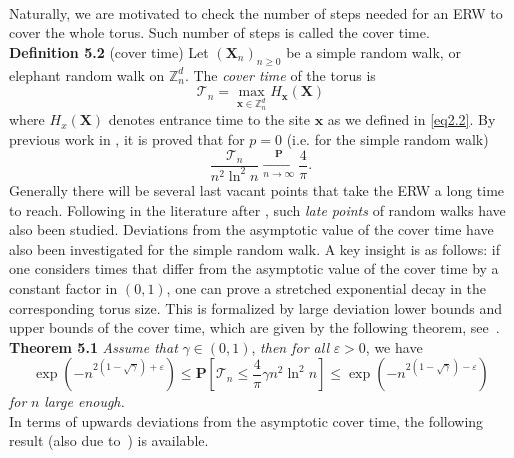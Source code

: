 \documentclass[
11pt, %
a4paper, %
oneside, %
headinclude,footinclude, %
BCOR5mm, %
]{scrartcl}
\begin{document}
\vspace{0.6em}\\ Naturally, we are motivated to check the number of steps needed for an ERW to cover the whole torus. Such number of steps is called the cover time.
\vspace{0.6em}\\\textbf{Definition 5.2} (cover time) Let $(\mathbf{X}_n)_{n \geq 0}$ be a simple random walk, or elephant random walk on  $\mathbb{Z}_n^d$. The \textit{cover time} of the torus is 
\begin{equation}
    \mathcal{T}_n=\max_{\mathbf{x} \in \mathbb{Z}_n^d}H_\mathbf{x}(\mathbf{X}) \tag{5.4}
\end{equation}
where $H_x(\mathbf{X})$ denotes entrance time to the site ${\mathbf{x}}$ as we defined in \eqref{eq2.2}. By previous work in \cite{dembo2004cover}, it is proved that for $p = 0$ (i.e. for the simple random walk)
\begin{equation}
    \label{eq5.5}
    \frac{\mathcal{T}_n}{n^2\ln^2n}\xrightarrow[n \rightarrow \infty]{\mathbf{P}}\frac{4}{\pi}. \tag{5.5} 
\end{equation}
Generally there will be several last vacant points that take the ERW a long time to reach. Following in the literature after \cite{dembo2004cover}, such
\textit{late points} of random walks have also been studied. Deviations from the asymptotic value of the cover time have also been investigated for the simple random walk. A key insight is as follows: if one considers times that differ from the asymptotic value of the cover time by a constant factor in $(0,1)$, one can prove a stretched exponential decay in the corresponding torus size. This is formalized by large deviation lower bounds and upper bounds of the cover time, which are given by the following theorem, see~\cite{comets2013large}.
\vspace{0.6em}\\\textbf{Theorem 5.1} \textit{Assume that} $\gamma \in (0,1)$, \textit{then for all} $\varepsilon>0$, we have
\begin{equation}
    \exp{\left(-n^{2(1-\sqrt{\gamma})+\varepsilon}\right)} \leq \mathbf{P}\left[\mathcal{T}_n \leq \frac{4}{\pi}\gamma n^2\ln^2n \right] \leq \exp{\left(-n^{2(1-\sqrt{\gamma})-\varepsilon}\right)} \tag{5.6}
\end{equation}
\textit{for} $n$ \textit{large enough.}\vspace{0.6em}\\ 
In terms of upwards deviations from the asymptotic cover time, the following result (also due to~\cite{comets2013large}) is available.
\end{document}
